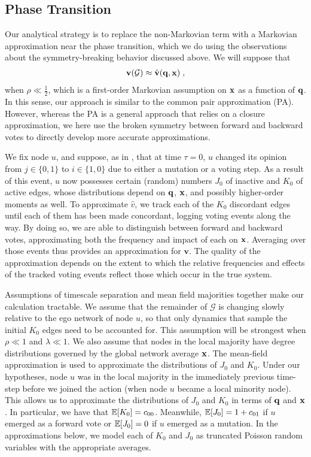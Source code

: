 \documentclass[review, onefignum, onetabnum]{siamart171218}
\begin{document}
	\subsection{Phase Transition}
		Our analytical strategy is to replace the non-Markovian term with a Markovian approximation near the phase transition, which we do using the observations about the symmetry-breaking behavior discussed above. 
		We will suppose that 
		\begin{align}
			\mathbf{v}(\mathcal{G}) \approx \hat{\mathbf{v}}(\q, \x)\;, \label{eq:markov}
		\end{align}
		when $\rho \ll \frac{1}{2}$, which is a first-order Markovian assumption on $\mathbf{x}$ as a function of $\mathbf{q}$. 
		In this sense, our approach is similar to the common pair approximation (PA). 
		However, whereas the PA is a general approach that relies on a closure approximation, we here use the broken symmetry between forward and backward votes to directly develop more accurate approximations. 

		We fix node $u$, and suppose, as in , that at time $\tau = 0$, $u$ changed its opinion from $j \in \{0,1\}$ to $i \in \{1,0\}$ due to either a mutation or a voting step. 
		As a result of this event, $u$ now possesses certain (random) numbers $J_0$ of inactive and $K_0$ of active edges, whose distributions depend on $\mathbf{q}$, $\mathbf{x}$, and possibly higher-order moments as well.
		To approximate $\hat{v}$, we track each of the $K_0$ discordant edges until each of them has been made concordant, logging voting events along the way. 
		By doing so, we are able to distinguish between forward and backward votes, approximating both the frequency and impact of each on $\mathbf{x}$. 
		Averaging over those events thus provides an approximation for $\mathbf{v}$.
		The quality of the approximation depends on the extent to which the relative frequencies and effects of the tracked voting events reflect those which occur in the true system. 

	Assumptions of timescale separation and mean field majorities together make our calculation tractable.
	We assume that the remainder of $\mathcal{G}$ is changing slowly relative to the ego network of node $u$, so that only dynamics that sample the initial $K_0$ edges need to be accounted for. 
			This assumption will be strongest when $\rho \ll 1$ and $\lambda \ll 1$. 
	We also assume that nodes in the local majority have degree distributions governed by the global network average $\mathbf{x}$. 
		The mean-field approximation is used to approximate the distributions of $J_0$ and $K_0$. 
		Under our hypotheses, node $u$ was in the local majority in the immediately previous time-step before we joined the action (when node $u$ became a local minority node).
		This allows us to approximate the distributions of $J_0$ and $K_0$ in terms of $\mathbf{q}$ and $\mathbf{x}$. 
		In particular, we have that $\mathbb{E}[K_0] = c_{00}$. Meanwhile, $\mathbb{E}[J_0] = 1 + c_{01}$ if $u$ emerged as a forward vote or $\mathbb{E}[J_0] = 0$ if $u$ emerged as a mutation. 
		In the approximations below, we model each of $K_0$ and $J_0$ as truncated Poisson random variables with the appropriate averages. 
\end{document}

